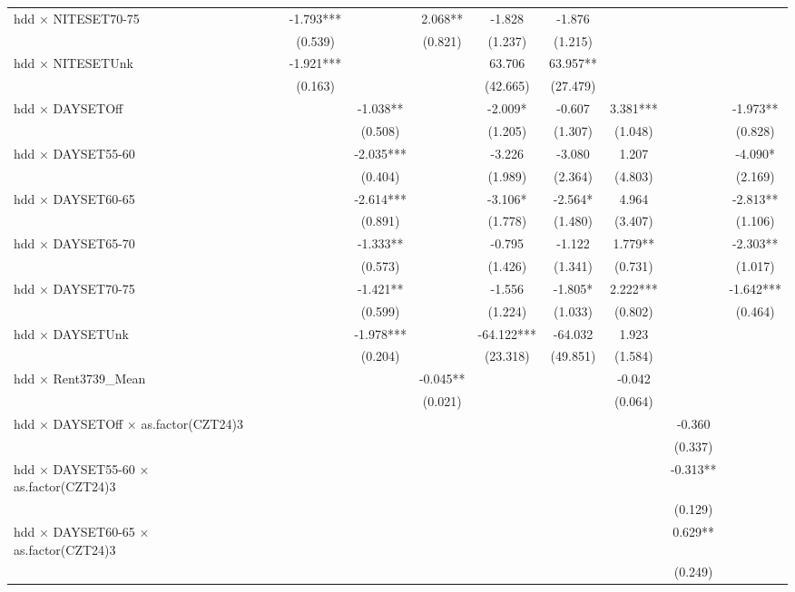 \documentclass[
]{article}
\begin{document}
\begin{table}
{\begin{tabular}[t]{lcccccccccc}
hdd × NITESET70-75 &  &  & -1.793*** &  & 2.068** & -1.828 & -1.876 &  &  & \\
 &  &  & (0.539) &  & (0.821) & (1.237) & (1.215) &  &  & \\
hdd × NITESETUnk &  &  & -1.921*** &  &  & 63.706 & 63.957** &  &  & \\
 &  &  & (0.163) &  &  & (42.665) & (27.479) &  &  & \\
hdd × DAYSETOff &  &  &  & -1.038** &  & -2.009* & -0.607 & 3.381*** &  & -1.973**\\
 &  &  &  & (0.508) &  & (1.205) & (1.307) & (1.048) &  & (0.828)\\
hdd × DAYSET55-60 &  &  &  & -2.035*** &  & -3.226 & -3.080 & 1.207 &  & -4.090*\\
 &  &  &  & (0.404) &  & (1.989) & (2.364) & (4.803) &  & (2.169)\\
hdd × DAYSET60-65 &  &  &  & -2.614*** &  & -3.106* & -2.564* & 4.964 &  & -2.813**\\
 &  &  &  & (0.891) &  & (1.778) & (1.480) & (3.407) &  & (1.106)\\
hdd × DAYSET65-70 &  &  &  & -1.333** &  & -0.795 & -1.122 & 1.779** &  & -2.303**\\
 &  &  &  & (0.573) &  & (1.426) & (1.341) & (0.731) &  & (1.017)\\
hdd × DAYSET70-75 &  &  &  & -1.421** &  & -1.556 & -1.805* & 2.222*** &  & -1.642***\\
 &  &  &  & (0.599) &  & (1.224) & (1.033) & (0.802) &  & (0.464)\\
hdd × DAYSETUnk &  &  &  & -1.978*** &  & -64.122*** & -64.032 & 1.923 &  & \\
 &  &  &  & (0.204) &  & (23.318) & (49.851) & (1.584) &  & \\
hdd × Rent3739\_Mean &  &  &  &  & -0.045** &  &  & -0.042 &  & \\
 &  &  &  &  & (0.021) &  &  & (0.064) &  & \\
hdd × DAYSETOff × as.factor(CZT24)3 &  &  &  &  &  &  &  &  & -0.360 & \\
 &  &  &  &  &  &  &  &  & (0.337) \vphantom{1} & \\
hdd × DAYSET55-60 × as.factor(CZT24)3 &  &  &  &  &  &  &  &  & -0.313** & \\
 &  &  &  &  &  &  &  &  & (0.129) & \\
hdd × DAYSET60-65 × as.factor(CZT24)3 &  &  &  &  &  &  &  &  & 0.629** & \\
 &  &  &  &  &  &  &  &  & (0.249) \vphantom{2} & \\

\end{tabular}}
\end{table}
\end{document}
